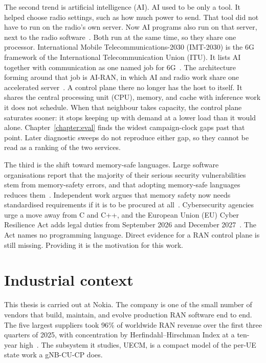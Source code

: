 \documentclass[english,oneside,a4paper,censored,csm,software-track-2020]{HYthesisML}
\begin{document}
The second trend is artificial intelligence (AI). AI used to be only a tool.
It helped choose radio settings, such as how much power to send. That tool did
not have to run on the radio's own server. Now AI programs also run on that
server, next to the radio software~\cite{polese2026airan}. Both run at the same
time, so they share one processor. International Mobile
Telecommunications-2030 (IMT-2030) is the 6G framework of the
International Telecommunication Union (ITU). It lists AI together with
communication as one named job for 6G~\cite{itu2023imt2030}. The architecture
forming around that job is AI-RAN, in which AI and radio work share one
accelerated server~\cite{airan2026orchestrator}. A control plane there
no longer has the host to itself. It shares the central processing unit
(CPU), memory, and cache with inference work it does not schedule. When
that neighbour takes capacity, the control plane saturates sooner: it
stops keeping up with demand at a lower load than it would alone.
Chapter~\ref{chapter:eval} finds the widest campaign-clock gaps past
that point. Later diagnostic sweeps do not reproduce either gap, so they
cannot be read as a ranking of the two services.

The third is the shift toward memory-safe languages. Large software
organisations report that the majority of their serious security
vulnerabilities stem from memory-safety errors, and that adopting
memory-safe languages reduces
them~\cite{msrc2019memory,google2022android,vanderstoep2025android,google2024securebydesign}.
Independent work argues that memory safety now needs standardised
requirements if it is to be procured at
all~\cite{watson2025memorysafety}. Cybersecurity agencies urge a move
away from C and C++, and the European Union (EU) Cyber Resilience Act
adds legal duties from September 2026 and December
2027~\cite{cisa2023memorysafe,oncd2024building,eu2024cra}. The Act names
no programming language. Direct evidence for a RAN control plane is
still missing. Providing it is the motivation for this work.

\section{Industrial context}\label{sec:industrial}
This thesis is carried out at Nokia. The company is one of the small number of vendors
that build, maintain, and evolve production RAN software end to end. The five largest
suppliers took 96\% of worldwide RAN revenue over the first three quarters of 2025, with
concentration by Herfindahl--Hirschman Index at a ten-year
high~\cite{delloro2025ran3q,delloro2026ran}. The subsystem it studies, UECM, is a compact model of the per-UE state work a
gNB-CU-CP does.
\end{document}
